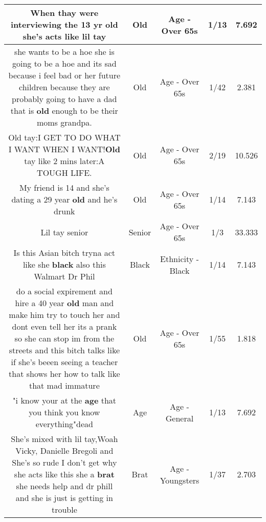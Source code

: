 \documentclass[11pt]{article}
\newlength\mylength
\begin{document}
\begin{center}
\begin{longtable}{|C{.65\mylength}|C{.30\mylength}|C{.12\mylength}|C{.12\mylength}|C{.12\mylength}|}
  \small When thay were interviewing the 13 yr \textbf{old} she's acts like lil tay\normalsize   & Old & Age - Over 65s & 1/13 & 7.692 \\  \hline
  \small she wants to be a hoe she is going to be a hoe and its sad because i feel bad or her future children because they are probably going to have a dad that is \textbf{old} enough to be their moms grandpa.\normalsize   & Old & Age - Over 65s & 1/42 & 2.381 \\  \hline
  \small Old tay:I GET TO DO WHAT I WANT WHEN I WANT!\textbf{Old} tay like 2 mins later:A TOUGH LIFE.\normalsize   & Old & Age - Over 65s & 2/19 & 10.526 \\  \hline
  \small My friend is 14 and she's dating a 29 year \textbf{old} and he's drunk\normalsize   & Old & Age - Over 65s & 1/14 & 7.143 \\  \hline
  \small Lil tay senior\normalsize   & Senior & Age - Over 65s & 1/3 & 33.333 \\  \hline
  \small Is this Asian bitch tryna act like she \textbf{black} also this Walmart Dr Phil\normalsize   & Black & Ethnicity - Black & 1/14 & 7.143 \\  \hline
  \small do a social expirement and hire a 40 year \textbf{old} man and make him try to touch her and dont even tell her its a prank so she can stop im from the streets and this bitch talks like if she's beeen seeing a teacher that shows her how to talk like that mad immature\normalsize   & Old & Age - Over 65s & 1/55 & 1.818 \\  \hline
  \small "i know your at the \textbf{age} that you think you know everything"dead\normalsize   & Age & Age - General & 1/13 & 7.692 \\  \hline
  \small She's mixed with lil tay,Woah Vicky, Danielle Bregoli and She's so rude I don't get why she acts like this she a \textbf{brat} she needs help and dr phill and she is just is getting in trouble\normalsize   & Brat & Age - Youngsters & 1/37 & 2.703 \\  \hline

\end{longtable}
\end{center}
\end{document}

